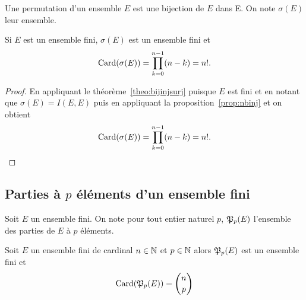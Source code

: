 \begin{defdef}
  Une permutation d'un ensemble \(E\) est une bijection de \(E\) dans E. On note 
  \(\sigma(E)\) leur ensemble.
\end{defdef}

\begin{prop}
  Si \(E\) est un ensemble fini, \(\sigma(E)\) est un ensemble fini et
  \begin{equation}
    \operatorname{Card}(\sigma(E))=\prod_{k = 0}^{n - 1}(n - k)=n!.
  \end{equation}
\end{prop}

\begin{proof}
  En appliquant le théorème~\ref{theo:bijinjsurj} puisque \(E\) est fini et en 
  notant que \(\sigma(E)=I(E, E)\) puis en appliquant la 
  proposition~\ref{prop:nbinj} et on obtient
  \begin{equation}
    \operatorname{Card}(\sigma(E))=\prod_{k = 0}^{n - 1}(n - k)=n!.
  \end{equation}
\end{proof}

\subsection{Parties à \(p\) éléments d'un ensemble fini}

Soit \(E\) un ensemble fini. On note pour tout entier naturel \(p\), 
\(\mathfrak{P}_p(E)\) l'ensemble des parties de \(E\) à \(p\) éléments.

\begin{prop}
  \label{prop:ppartiesfinies}
  Soit \(E\) un ensemble fini de cardinal \(n\in \mathbb{N}\) et \(p \in \mathbb{N}\) alors 
  \(\mathfrak{P}_p(E)\) est un ensemble fini et
  \begin{equation}
    \operatorname{Card}(\mathfrak{P}_p(E))=\binom{n}{p}
  \end{equation}
\end{prop}

